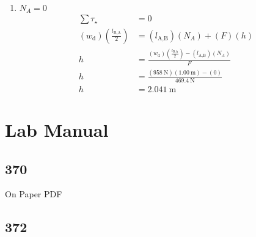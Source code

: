 \documentclass{article}
\begin{document}
\begin{enumerate}[label=\textbf{(\alph*)}]
	\item
		$ N_A = 0 $
		\begin{align*}
			\sum \tau_\star & = 0 \\
			(w_\text{d}) \left( \frac{l_\text{B,A}}{2} \right) & = (l_\text{A,B})(N_A) + (F)(h) \\
			h & = \frac{(w_\text{d}) \left( \frac{l_\text{B,A}}{2} \right) - (l_\text{A,B})(N_A)}{F} \\
			h & = \frac{(\SI{958}{\newton})(\SI{1.00}{\meter}) - (0)}{\SI{469.4}{\newton}} \\
			h & = \SI{2.041}{\meter}
		\end{align*}
\end{enumerate}

\section{Lab Manual}

\subsection{370}
On Paper PDF

\subsection{372}
\end{document}
